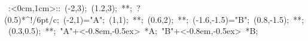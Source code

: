 %

\hbox{
\xy    <1cm,0cm>:<0cm,1cm>::
       (-2,3); (1.2,3); **\dir{-}; ?(0.5)*^!/6pt/{c};
       (-2,1)="A"; (1,1); **\dir{-}; (0.6,2); **\dir{-};
       (-1.6,-1.5)="B"; (0.8,-1.5); **\dir{-}; (0.3,0.5); **\dir{-};
       "A"+<-0.8em,-0.5ex> *{A};
       "B"+<-0.8em,-0.5ex> *{B};
\endxy}


